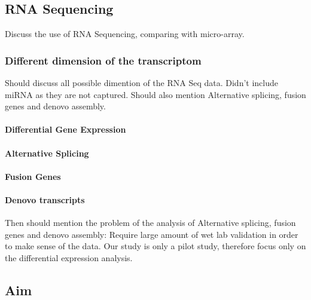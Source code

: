 \subsection{RNA Sequencing}
Discuss the use of RNA Sequencing, comparing with micro-array. 
\subsubsection{Different dimension of the transcriptom}
Should discuss all possible dimention of the RNA Seq data. 
Didn't include miRNA as they are not captured.
Should also mention Alternative splicing, fusion genes and denovo assembly.
\paragraph{Differential Gene Expression}
\paragraph{Alternative Splicing}
\paragraph{Fusion Genes}
\paragraph{Denovo transcripts}
Then should mention the problem of the analysis of Alternative splicing, fusion genes and denovo assembly:
Require large amount of wet lab validation in order to make sense of the data.
Our study is only a pilot study, therefore focus only on the differential expression analysis. 
\subsection{Aim}


